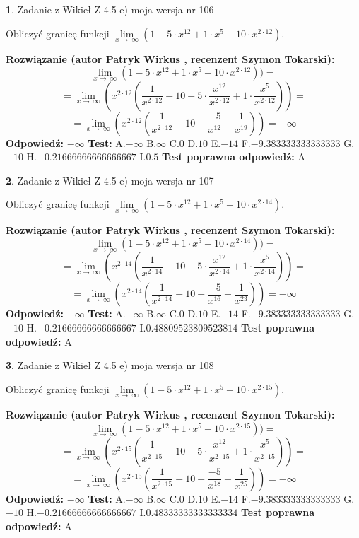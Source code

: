 \documentclass[12pt, a4paper]{article}
\theoremstyle{definition} %
\newtheorem{zad}{}
\newcommand{\zadStart}[1]{\begin{zad}#1\newline}
\newcommand{\zadStop}{\end{zad}}
\newcommand{\rozwStart}[2]{\noindent \textbf{Rozwiązanie (autor #1 , recenzent #2): }\newline}
\newcommand{\rozwStop}{\newline}
\newcommand{\odpStart}{\noindent \textbf{Odpowiedź:}\newline}
\newcommand{\odpStop}{\newline}
\newcommand{\testStart}{\noindent \textbf{Test:}\newline}
\newcommand{\testStop}{\newline}
\newcommand{\kluczStart}{\noindent \textbf{Test poprawna odpowiedź:}\newline}
\newcommand{\kluczStop}{\newline}
\begin{document}
\zadStart{Zadanie z Wikieł Z 4.5 e) moja wersja nr 106}


Obliczyć granicę funkcji  $\lim\limits_{x\to\ \infty}(1 - 5 \cdot x^{12}+1 \cdot x^{5}- 10 \cdot x^{2\cdot12})$.
\zadStop
\rozwStart{Patryk Wirkus}{Szymon Tokarski}
$$\lim\limits_{x\to\ \infty}(1 - 5 \cdot x^{12}+1 \cdot x^{5}- 10 \cdot x^{2\cdot12}))=$$
$$=\lim\limits_{x\to\ \infty}(x^{2\cdot12}(\frac{1}{x^{2\cdot12}}-10 -5 \cdot \frac{x^{12}}{x^{2\cdot12}}+1 \cdot \frac{x^{5}}{x^{2\cdot12}}))=$$
$$=\lim\limits_{x\to\ \infty}(x^{2\cdot12}(\frac{1}{x^{2\cdot12}}-10 + \frac{-5}{x^{12}}+ \frac{1}{x^{19}}))=-\infty$$
\rozwStop
\odpStart
$-\infty$
\odpStop
\testStart
A.$-\infty$ B.$\infty$ C.$0$ D.$10$ E.$-14$
F.$-9.383333333333333$ G.$-10$
H.$-0.21666666666666667$
I.$0.5$
\testStop
\kluczStart
A
\kluczStop



\zadStart{Zadanie z Wikieł Z 4.5 e) moja wersja nr 107}


Obliczyć granicę funkcji  $\lim\limits_{x\to\ \infty}(1 - 5 \cdot x^{12}+1 \cdot x^{5}- 10 \cdot x^{2\cdot14})$.
\zadStop
\rozwStart{Patryk Wirkus}{Szymon Tokarski}
$$\lim\limits_{x\to\ \infty}(1 - 5 \cdot x^{12}+1 \cdot x^{5}- 10 \cdot x^{2\cdot14}))=$$
$$=\lim\limits_{x\to\ \infty}(x^{2\cdot14}(\frac{1}{x^{2\cdot14}}-10 -5 \cdot \frac{x^{12}}{x^{2\cdot14}}+1 \cdot \frac{x^{5}}{x^{2\cdot14}}))=$$
$$=\lim\limits_{x\to\ \infty}(x^{2\cdot14}(\frac{1}{x^{2\cdot14}}-10 + \frac{-5}{x^{16}}+ \frac{1}{x^{23}}))=-\infty$$
\rozwStop
\odpStart
$-\infty$
\odpStop
\testStart
A.$-\infty$ B.$\infty$ C.$0$ D.$10$ E.$-14$
F.$-9.383333333333333$ G.$-10$
H.$-0.21666666666666667$
I.$0.48809523809523814$
\testStop
\kluczStart
A
\kluczStop



\zadStart{Zadanie z Wikieł Z 4.5 e) moja wersja nr 108}


Obliczyć granicę funkcji  $\lim\limits_{x\to\ \infty}(1 - 5 \cdot x^{12}+1 \cdot x^{5}- 10 \cdot x^{2\cdot15})$.
\zadStop
\rozwStart{Patryk Wirkus}{Szymon Tokarski}
$$\lim\limits_{x\to\ \infty}(1 - 5 \cdot x^{12}+1 \cdot x^{5}- 10 \cdot x^{2\cdot15}))=$$
$$=\lim\limits_{x\to\ \infty}(x^{2\cdot15}(\frac{1}{x^{2\cdot15}}-10 -5 \cdot \frac{x^{12}}{x^{2\cdot15}}+1 \cdot \frac{x^{5}}{x^{2\cdot15}}))=$$
$$=\lim\limits_{x\to\ \infty}(x^{2\cdot15}(\frac{1}{x^{2\cdot15}}-10 + \frac{-5}{x^{18}}+ \frac{1}{x^{25}}))=-\infty$$
\rozwStop
\odpStart
$-\infty$
\odpStop
\testStart
A.$-\infty$ B.$\infty$ C.$0$ D.$10$ E.$-14$
F.$-9.383333333333333$ G.$-10$
H.$-0.21666666666666667$
I.$0.48333333333333334$
\testStop
\kluczStart
A
\kluczStop
\end{document}
